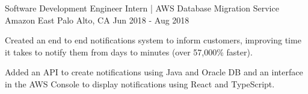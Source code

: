 \begin{cventries}
    \cventry
    {Software Development Engineer Intern | AWS Database Migration Service} %
    {Amazon} %
    {East Palo Alto, CA} %
    {Jun 2018 - Aug 2018} %
    {
        \begin{cvitems} %
            \item {Created an end to end notifications system to inform customers, improving time it takes to notify them from days to minutes (over 57,000\% faster).}
            \item {Added an API to create notifications using Java and Oracle DB and an interface in the AWS Console to display notifications using React and TypeScript.}
        \end{cvitems}
    }

\end{cventries}
